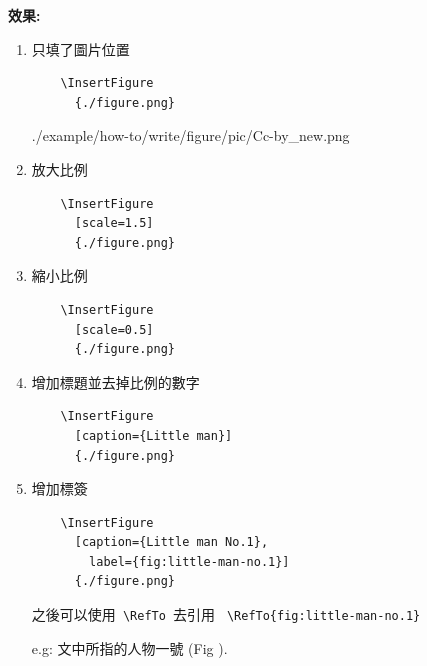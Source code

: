   \newpage
  {\bf 效果:}
  \begin{enumerate}
  \item
  {
    只填了圖片位置
    \begin{verbatim}
    \InsertFigure
      {./figure.png}
    \end{verbatim}
    \InsertFigure
      {./example/how-to/write/figure/pic/Cc-by_new.png}
  } %

  \item
  {
    放大比例
    \begin{verbatim}
    \InsertFigure
      [scale=1.5]
      {./figure.png}
    \end{verbatim}
  } %

  \item
  {
    縮小比例
    \begin{verbatim}
    \InsertFigure
      [scale=0.5]
      {./figure.png}
    \end{verbatim}
  } %

  \newpage
  \item
  {
    增加標題並去掉比例的數字
    \begin{verbatim}
    \InsertFigure
      [caption={Little man}]
      {./figure.png}
    \end{verbatim}
  } %

  \item
  {
    增加標簽
    \begin{verbatim}
    \InsertFigure
      [caption={Little man No.1},
        label={fig:little-man-no.1}]
      {./figure.png}
    \end{verbatim}

    之後可以使用\verb| \RefTo |去引用 \verb| \RefTo{fig:little-man-no.1} |

    e.g: 文中所指的人物一號 (Fig ).
  } %


\end{enumerate}
